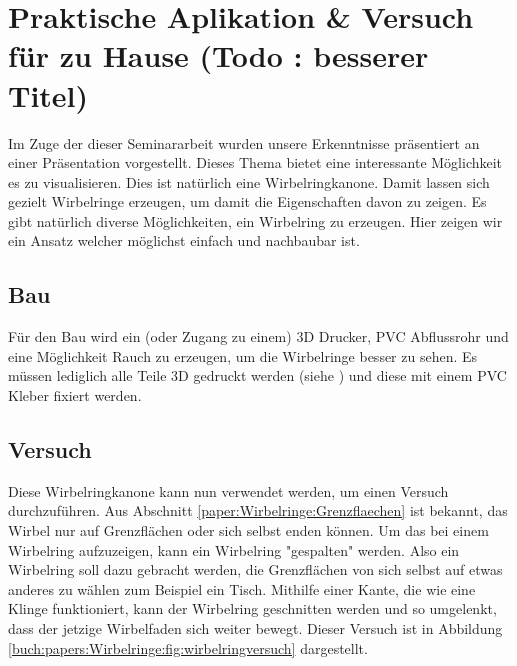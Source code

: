 \section{Praktische Aplikation \& Versuch für zu Hause (Todo : besserer Titel)}

Im Zuge der dieser Seminararbeit wurden unsere Erkenntnisse präsentiert an einer Präsentation vorgestellt. 
Dieses Thema bietet eine interessante Möglichkeit es zu visualisieren. 
Dies ist natürlich eine Wirbelringkanone. 
Damit lassen sich gezielt Wirbelringe erzeugen, um damit die Eigenschaften davon zu zeigen. 
Es gibt natürlich diverse Möglichkeiten, ein Wirbelring zu erzeugen. 
Hier zeigen wir ein Ansatz welcher möglichst einfach und nachbaubar ist.

\subsection{Bau}


Für den Bau wird ein (oder Zugang zu einem) 3D Drucker,  PVC Abflussrohr und eine Möglichkeit Rauch zu erzeugen, um die Wirbelringe besser zu sehen. 
Es müssen lediglich alle Teile 3D gedruckt werden (siehe \cite{Wirbelringe:3D_modelle}) und diese mit einem PVC Kleber fixiert werden. 

\subsection{Versuch}

Diese Wirbelringkanone kann nun verwendet werden, um einen Versuch durchzuführen. 
Aus Abschnitt \ref{paper:Wirbelringe:Grenzflaechen} ist bekannt, das Wirbel nur auf Grenzflächen oder sich selbst enden können. 
Um das bei einem Wirbelring aufzuzeigen, kann ein Wirbelring "gespalten" werden. 
Also ein Wirbelring soll dazu gebracht werden, die Grenzflächen von sich selbst auf etwas anderes zu wählen zum Beispiel ein Tisch. 
Mithilfe einer Kante, die wie eine Klinge funktioniert, kann der Wirbelring geschnitten werden und so umgelenkt, dass der jetzige Wirbelfaden sich weiter bewegt. 
Dieser Versuch ist in Abbildung \ref{buch:papers:Wirbelringe:fig:wirbelringversuch} dargestellt.


